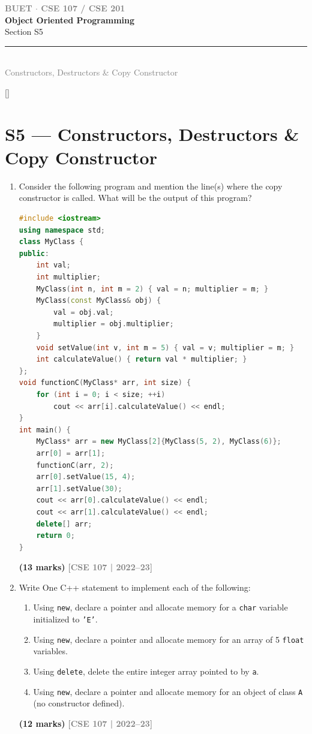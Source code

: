 \documentclass[12pt,a3paper]{article}
\newcommand{\yr}[1]{\hfill\textcolor{gray}{\small\textbf{[#1]}}}
\newcommand{\mk}[1]{\textcolor{orange!70!black}{\small\textbf{(#1 marks)}}}
\newcommand{\secdivider}[4]{%
  \newpage\thispagestyle{empty}%
  \vspace*{\fill}%
  \begin{tcolorbox}[enhanced,colback=#4!7,colframe=#3,boxrule=1.5pt,arc=8pt,
    left=20pt,right=20pt,top=22pt,bottom=22pt,
    shadow={3pt}{-3pt}{0pt}{black!15}]
    \centering
    {\large\textcolor{gray}{\textbf{BUET $\cdot$ CSE 107 / CSE 201}}}\\[8pt]
    {\fontsize{26}{32}\selectfont\bfseries\textcolor{#3}{Object Oriented Programming}}\\[6pt]
    {\fontsize{15}{19}\selectfont\textcolor{dgray}{#1}}\\[12pt]
    \textcolor{#3!60}{\rule{0.5\textwidth}{0.5pt}}\\[6pt]
    {\small\textcolor{gray}{#2}}
  \end{tcolorbox}%
  \vspace*{\fill}\newpage%
}
\begin{document}
\secdivider{Section S5}{Constructors, Destructors \& Copy Constructor}{cE}{cE}
\label{sec:S5}
\titleformat{\section}{\large\bfseries\color{cE}}{}{0em}{}[\titlerule]
\section{S5 --- Constructors, Destructors \& Copy Constructor}

\begin{enumerate}
\item Consider the following program and mention the line(s) where the copy constructor is called. What will be the output of this program?
\begin{lstlisting}[language=C++]
#include <iostream>
using namespace std;
class MyClass {
public:
    int val;
    int multiplier;
    MyClass(int n, int m = 2) { val = n; multiplier = m; }
    MyClass(const MyClass& obj) {
        val = obj.val;
        multiplier = obj.multiplier;
    }
    void setValue(int v, int m = 5) { val = v; multiplier = m; }
    int calculateValue() { return val * multiplier; }
};
void functionC(MyClass* arr, int size) {
    for (int i = 0; i < size; ++i)
        cout << arr[i].calculateValue() << endl;
}
int main() {
    MyClass* arr = new MyClass[2]{MyClass(5, 2), MyClass(6)};
    arr[0] = arr[1];
    functionC(arr, 2);
    arr[0].setValue(15, 4);
    arr[1].setValue(30);
    cout << arr[0].calculateValue() << endl;
    cout << arr[1].calculateValue() << endl;
    delete[] arr;
    return 0;
}
\end{lstlisting}
\mk{13}
\yr{CSE 107 | 2022--23}







\item Write One C++ statement to implement each of the following:
\begin{enumerate}
  \item Using \texttt{new}, declare a pointer and allocate memory for a \texttt{char} variable initialized to \texttt{'E'}.
  \item Using \texttt{new}, declare a pointer and allocate memory for an array of 5 \texttt{float} variables.
  \item Using \texttt{delete}, delete the entire integer array pointed to by \texttt{a}.
  \item Using \texttt{new}, declare a pointer and allocate memory for an object of class \texttt{A} (no constructor defined).
\end{enumerate}
\mk{12}
\yr{CSE 107 | 2022--23}



\end{enumerate}
\end{document}
